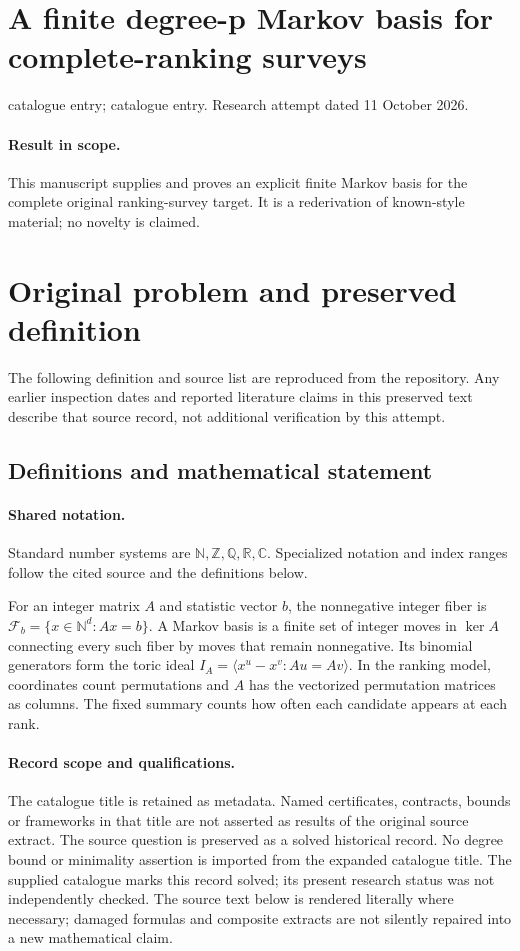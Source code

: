 \documentclass[11pt]{article}
\begin{document}
\section*{A finite degree-p Markov basis for complete-ranking surveys}
\noindent catalogue entry; catalogue entry. Research attempt dated 11 October 2026.
\paragraph{Result in scope.}This manuscript supplies and proves an explicit finite Markov basis for the complete original ranking-survey target. It is a rederivation of known-style material; no novelty is claimed.
\section{Original problem and preserved definition}
The following definition and source list are reproduced from the repository. Any earlier inspection dates and reported literature claims in this preserved text describe that source record, not additional verification by this attempt.
\subsection{Definitions and mathematical statement}

\paragraph{Shared notation.}Standard number systems are $\mathbb N,\mathbb Z,\mathbb Q,\mathbb R,\mathbb C$. Specialized notation and index ranges follow the cited source and the definitions below.


For an integer matrix $A$ and statistic vector $b$, the nonnegative integer fiber is $\mathcal F_b=\{x\in\mathbb N^d:Ax=b\}$. A Markov basis is a finite set of integer moves in $\ker A$ connecting every such fiber by moves that remain nonnegative. Its binomial generators form the toric ideal $I_A=\langle x^u-x^v:Au=Av\rangle$. In the ranking model, coordinates count permutations and $A$ has the vectorized permutation matrices as columns. The fixed summary counts how often each candidate appears at each rank.
\paragraph{Record scope and qualifications.}
The catalogue title is retained as metadata. Named certificates, contracts, bounds or frameworks in that title are not asserted as results of the original source extract.
The source question is preserved as a solved historical record. No degree bound or minimality assertion is imported from the expanded catalogue title. The supplied catalogue marks this record solved; its present research status was not independently checked.
The source text below is rendered literally where necessary; damaged formulas and composite extracts are not silently repaired into a new mathematical claim.
\end{document}
